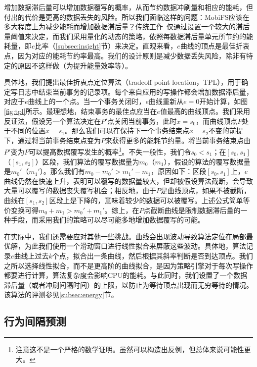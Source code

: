 增加数据滞后量可以增加数据覆写的概率，从而节约数据冲刷量和相应的能耗，但付出的代价是更高的数据丢失的风险。所以我们面临这样的问题：MobiFS应该在多大程度上为减少能耗而增加数据滞后量？传统工作~\cite{Ma:2011:LPF:1989323.1989325, Mickens:2014:BFC:2616448.2616473, Ports:2010:TCA:1924943.1924963}仅通过设置一个较大的滞后量阈值来决定，而我们采用量化的动态的策略，依照每数据滞后量单元所节约的能耗量，即$e$比率（\ref{subsec:insight}节）来决定。直观来看，$e$曲线的顶点是最佳折衷点，因为对应的能耗节约率最高。我们的设计原则是减少数据丢失风险，除非有特定的原因不这样做（为提升能量效率等）。 

具体地，我们提出最佳折衷点定位算法（tradeoff point location，TPL），用于确定写日志中结束当前事务的记录项。每个来自应用的写操作都会增加数据滞后量，对应于$e$曲线上的一个点。当一个事务关闭时，$e$曲线重新从$e=0$开始计算，如图\ref{fig:tpl}所示。最理想地，结束事务的最佳点应当在$e$值最高的曲线顶点。我们采用反证法，假设另一个算法决定在$P'$点关闭当前事务，此时$x = s_0$，而曲线顶点$P$处于不同的位置$x = s_1$。那么我们可以在保持下一个事务结束点$x = s_2$不变的前提下，通过将当前事务结束点变为$P$来获得更多的能耗节约量。将当前事务结束点由$P'$变为$P$可以提高数据覆写发生的概率\footnote{注意这不是一个严格的数学证明。虽然可以构造出反例，但总体来说可能性更大。}。不失一般性，我们令$s_0 < s_1$；在$[s_0, s_1]$（$[s_1, s_2]$）区段，我们算法的覆写数据量为$m_0$（$m_1$），假设的算法的覆写数据量是$m_0'$（$m_1'$）。那么我们有$m_0 - m_0' > m_1' -
m_1$，原因如下：区段$[s_0, s_1]$上，$e$曲线仍然在快速上升，表明可以覆写的数据量较大，但却被假设算法截断，会导致大量可以覆写的数据丧失覆写机会；相反地，由于$P$是曲线顶点，如果不被截断，曲线在$[s_1, s_2]$区段上是下降的，意味着较少的数据可以被覆写。上述公式简单等价变换可得$m_0 + m_1 > m_0' + m_1'$。综上，在$P$点截断曲线是限制数据滞后量的一种手段，而采用我们的策略可以尽可能多地增加数据覆写的可能。
 
在实际中，我们还需要应对其他一些挑战。曲线会出现波动导致算法定位在局部最优解，为此我们使用一个滑动窗口进行线性拟合来屏蔽这些波动。具体地，算法记录$e$曲线上过去$k$个点，拟合出一条曲线，然后根据其斜率判断是否到达顶点。我们之所以选择线性拟合，而不是更高阶的曲线拟合，是因为策略引擎对于每次写操作都要进行计算，算法复杂度会影响CPU的能耗。与此同时，我们设置了一个数据滞后量（或者冲刷间隔时间）的上限，以防止为等待顶点出现而无穷等待的情况。该算法的评测参见\ref{subsec:energy}节。

\subsection{行为间隔预测}
\label{subsec:interval}

